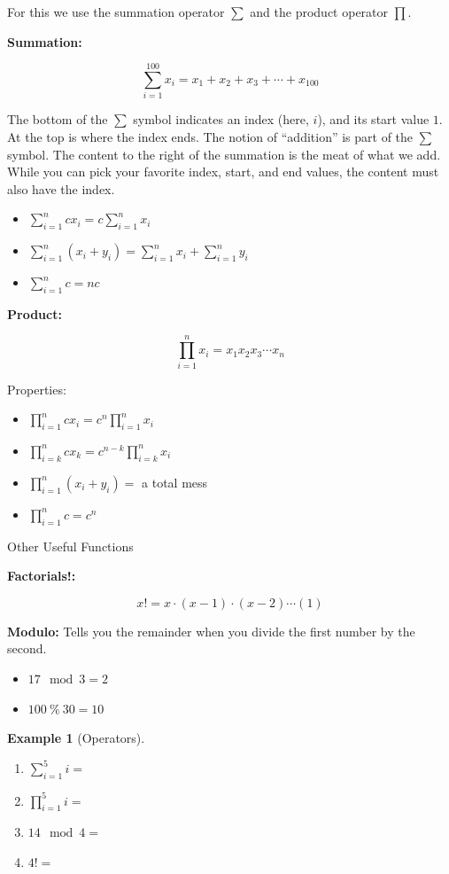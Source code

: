 \documentclass[
]{book}
\providecommand{\tightlist}{%
  \setlength{\itemsep}{0pt}\setlength{\parskip}{0pt}}
\theoremstyle{definition}
\theoremstyle{definition}
\newtheorem{example}{Example}[chapter]
\theoremstyle{definition}
\theoremstyle{remark}
\begin{document}
For this we use the summation operator \(\sum\) and the product operator \(\prod\).

\textbf{Summation:}

\[\sum\limits_{i=1}^{100} x_i = x_1+x_2+x_3+\cdots+x_{100}\]

The bottom of the \(\sum\) symbol indicates an index (here, \(i\)), and its start value \(1\). At the top is where the index ends. The notion of ``addition'' is part of the \(\sum\) symbol. The content to the right of the summation is the meat of what we add. While you can pick your favorite index, start, and end values, the content must also have the index.

\begin{itemize}
\tightlist
\item
  \(\sum\limits_{i=1}^n c x_i = c \sum\limits_{i=1}^n x_i\)
\item
  \(\sum\limits_{i=1}^n (x_i + y_i) = \sum\limits_{i=1}^n x_i + \sum\limits_{i=1}^n y_i\)
\item
  \(\sum\limits_{i=1}^n c = n c\)
\end{itemize}

\textbf{Product:}

\[\prod\limits_{i=1}^n x_i = x_1 x_2 x_3 \cdots x_n\]

Properties:

\begin{itemize}
\tightlist
\item
  \(\prod\limits_{i=1}^n c x_i = c^n \prod\limits_{i=1}^n x_i\)
\item
  \(\prod\limits_{i=k}^n c x_k = c^{n-k} \prod\limits_{i=k}^n x_i\)
\item
  \(\prod\limits_{i=1}^n (x_i + y_i) =\) a total mess
\item
  \(\prod\limits_{i=1}^n c = c^n\)
\end{itemize}

Other Useful Functions

\textbf{Factorials!:}

\[x! = x\cdot (x-1) \cdot (x-2) \cdots (1)\]

\textbf{Modulo:} Tells you the remainder when you divide the first number by the second.

\begin{itemize}
\tightlist
\item
  \(17 \mod 3 = 2\)
\item
  \(100 \ \% \ 30 = 10\)
\end{itemize}

\begin{example}[Operators]
\protect\hypertarget{exm:operators}{}{\label{exm:operators} {} }

\begin{enumerate}
\def\labelenumi{\arabic{enumi}.}
\item
  \(\sum\limits_{i=1}^{5} i =\)
\item
  \(\prod\limits_{i=1}^{5} i =\)
\item
  \(14 \mod 4 =\)
\item
  \(4! =\)
\end{enumerate}
\end{example}
\end{document}
